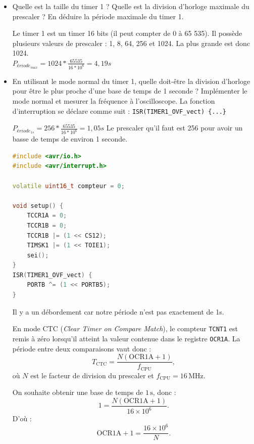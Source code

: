 \documentclass[a4paper,11pt]{article}
\begin{document}
\begin{itemize}
    \item Quelle est la taille du timer 1 ? Quelle est la division d'horloge maximale du prescaler ? En déduire la période maximale du timer 1.
    \begin{solution}
        Le timer 1 est un timer 16 bits (il peut compter de 0 à 65 535). Il possède plusieurs valeurs de prescaler : 1, 8, 64, 256 et 1024. La plus grande est donc 1024.\\
        $P_{ériode_{max}} = 1024 * \frac{65535}{16*10^{6}}=4,19 s$
    \end{solution}

    \item En utilisant le mode normal du timer 1, quelle doit-être la division d'horloge pour être le plus proche d'une base de temps de 1 seconde ? Implémenter le mode normal et mesurer la fréquence à l'oscilloscope. La fonction d'interruption se déclare comme suit : \texttt{ISR(TIMER1\_OVF\_vect) \{...\}}
    \begin{solution}
        $P_{ériode_{1s}} = 256*\frac{65535}{16*10^{6}} = 1,05 s$
        Le prescaler qu'il faut est 256 pour avoir un basse de temps de environ 1 seconde.
        \begin{lstlisting}[language=C++]
#include <avr/io.h>
#include <avr/interrupt.h>

volatile uint16_t compteur = 0;

void setup() {
    TCCR1A = 0;
    TCCR1B = 0;
    TCCR1B |= (1 << CS12);
    TIMSK1 |= (1 << TOIE1);
    sei();
}
ISR(TIMER1_OVF_vect) {
    PORTB ^= (1 << PORTB5);
}
        \end{lstlisting}
        Il y a un débordement car notre période n'est pas exactement de 1s.
    \end{solution}

    \begin{solution}
        En mode CTC (\textit{Clear Timer on Compare Match}), le compteur \texttt{TCNT1}
        est remis à zéro lorsqu'il atteint la valeur contenue dans le registre
        \texttt{OCR1A}. La période entre deux comparaisons vaut donc :
        \[
            T_{\mathrm{CTC}}
            = \frac{N\left(\mathrm{OCR1A}+1\right)}{f_{\mathrm{CPU}}},
        \]
        où \(N\) est le facteur de division du prescaler et
        \(f_{\mathrm{CPU}}=16\,\mathrm{MHz}\).

        On souhaite obtenir une base de temps de \(1\,\mathrm{s}\), donc :
        \[
            1
            = \frac{N\left(\mathrm{OCR1A}+1\right)}{16\times 10^6}.
        \]
        D'où :
        \[
            \mathrm{OCR1A}+1=\frac{16\times 10^6}{N}.
        \]


\end{solution}
\end{itemize}
\end{document}
